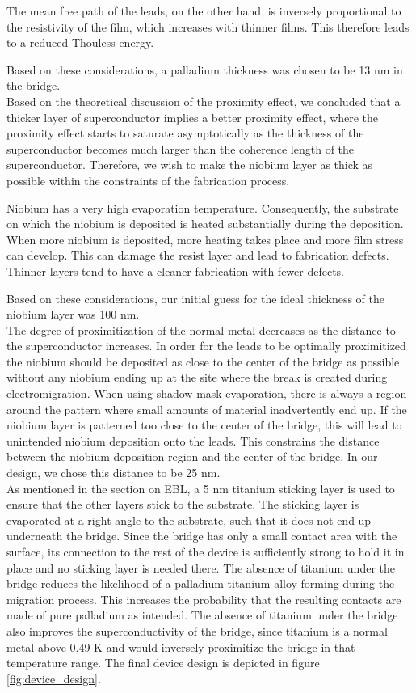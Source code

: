 The mean free path of the leads, on the other hand, is inversely proportional to the resistivity of the film, which increases with thinner films. This therefore leads to a reduced Thouless energy. 

Based on these considerations, a palladium thickness was chosen to be 13 nm in the bridge.\\

\noindent Based on the theoretical discussion of the proximity effect, we concluded that a thicker layer of superconductor implies a better proximity effect, where the proximity effect starts to saturate asymptotically as the thickness of the superconductor becomes much larger than the coherence length of the superconductor. Therefore, we wish to make the niobium layer as thick as possible within the constraints of the fabrication process. 

Niobium has a very high evaporation temperature. Consequently, the substrate on which the niobium is deposited is heated substantially during the deposition. When more niobium is deposited, more heating takes place and more film stress can develop. This can damage the resist layer and lead to fabrication defects. Thinner layers tend to have a cleaner fabrication with fewer defects. 

Based on these considerations, our initial guess for the ideal thickness of the niobium layer was 100 nm.\\


\noindent The degree of proximitization of the normal metal decreases as the distance to the superconductor increases. In order for the leads to be optimally proximitized the niobium should be deposited as close to the center of the bridge as possible without any niobium ending up at the site where the break is created during electromigration. When using shadow mask evaporation, there is always a region around the pattern where small amounts of material inadvertently end up. If the niobium layer is patterned too close to the center of the bridge, this will lead to unintended niobium deposition onto the leads. This constrains the distance between the niobium deposition region and the center of the bridge. In our design, we chose this distance to be 25 nm. \\


\noindent As mentioned in the section on EBL, a 5 nm titanium sticking layer is used to ensure that the other layers stick to the substrate. The sticking layer is evaporated at a right angle to the substrate, such that it does not end up underneath the bridge. Since the bridge has only a small contact area with the surface, its connection to the rest of the device is sufficiently strong to hold it in place and no sticking layer is needed there. The absence of titanium under the bridge reduces the likelihood of a palladium titanium alloy forming during the migration process. This increases the probability that the resulting contacts are made of pure palladium as intended. The absence of titanium under the bridge also improves the superconductivity of the bridge, since titanium is a normal metal above 0.49 K and would inversely proximitize the bridge in that temperature range. The final device design is depicted in figure \ref{fig:device_design}.

